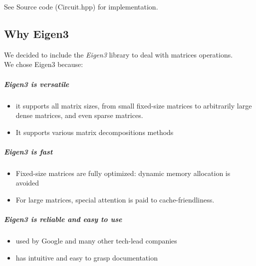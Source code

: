 \documentclass{article}
\begin{document}
\bigbreak
See Source code (Circuit.hpp) for implementation.

\newpage
\subsection{Why Eigen3}
We decided to include the \textit{Eigen3} library to deal with matrices operations.\\
We chose Eigen3 because:
\subparagraph{Eigen3 is versatile}
\begin{itemize}
    \item it supports all matrix sizes, from small fixed-size matrices to arbitrarily large dense matrices, and even sparse matrices.
    \item It supports various matrix decompositions methods
\end{itemize}
\subparagraph{Eigen3 is fast}
\begin{itemize}
    \item Fixed-size matrices are fully optimized: dynamic memory allocation is avoided
    \item For large matrices, special attention is paid to cache-friendliness.
\end{itemize}
\subparagraph{Eigen3 is reliable and easy to use}
\begin{itemize}
    \item used by Google and many other tech-lead companies
    \item has intuitive and easy to grasp documentation
\end{itemize}
\newpage
\end{document}
